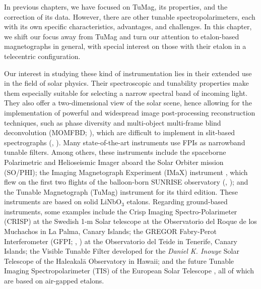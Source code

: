 

In previous chapters, we have focused on TuMag, its properties, and the correction of its data. However, there are other tunable spectropolarimeters, each with its own specific characteristics, advantages, and challenges. In this chapter, we shift our focus away from TuMag and turn our attention to etalon-based magnetographs in general, with special interest on those with their etalon in a telecentric configuration.

Our interest in studying these kind of instrumentation lies in their extended use in the field of solar physics. Their spectroscopic and tunability properties make them especially suitable for selecting a narrow spectral band of incoming light. They also offer a two-dimensional view of the solar scene, hence allowing for the implementation of powerful and widespread image post-processing reconstruction techniques, such as phase diversity \citep{PD_etalon} and multi-object multi-frame blind deconvolution (MOMFBD; \citealt{mombfd}), which are difficult to implement in slit-based spectrographs (\citealt{image_spectro}, \citealt{image_spectro_2}). Many state-of-the-art instruments use FPIs as narrowband tunable filters. Among others, these instruments include the spaceborne Polarimetric and Helioseismic Imager \citep[][]{PHI} aboard the Solar Orbiter mission \citep[][]{SO} (SO/PHI); the Imaging Magnetograph Experiment (IMaX) instrument \citep[][]{IMaX}, which flew on the first two flights of the balloon-born SUNRISE observatory (\citealt{SunriseI}, \citealt{SunriseII}); and the Tunable Magnetograph (TuMag) instrument for its third edition. These instruments are based on solid LiNbO$_3$ etalons. Regarding ground-based instruments, some examples include the Crisp Imaging Spectro-Polarimeter (CRISP) at the Swedish 1-m Solar telescope \citep[][]{crisp} at the Observatorio del Roque de los Muchachos in La Palma, Canary Islands; the GREGOR Fabry-Perot Interferometer (GFPI; \citealt{GFPI}, \citealt{GREGOR}) at the Observatorio del Teide in Tenerife, Canary Islands; the Visible Tunable Filter \citep[VTF;][]{VTF} developed for the \textit{Daniel K. Inouye} Solar Telescope \citep[DKIST;][]{DKIST} of the Haleakal\=a Observatory in Hawaii; and the future Tunable Imaging Spectropolarimeter (TIS) of the European Solar Telescope \citep{EST}, all of which are based on air-gapped etalons. 

